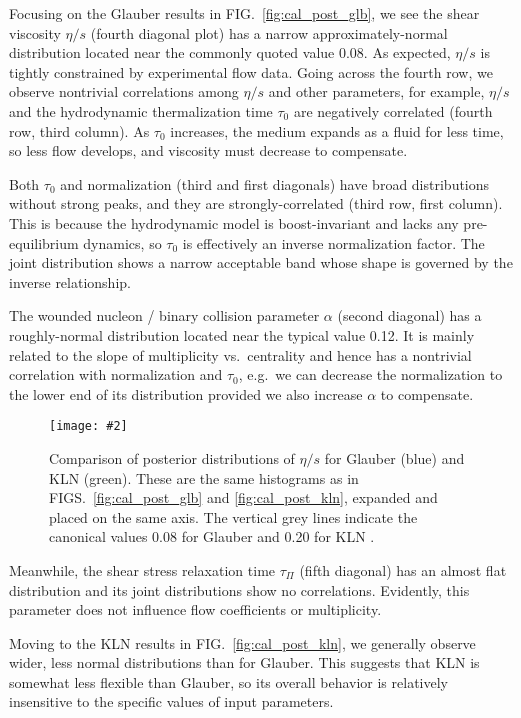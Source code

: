 \documentclass[aps,prc,reprint,superscriptaddress,amsmath]{revtex4-1}
\newcommand{\colfig}[3][t]{
  \begin{figure}[#1]
    \texttt{[image: \#2]}
    \caption{\label{fig:#2}#3}
  \end{figure}
}
\begin{document}
Focusing on the Glauber results in FIG.~\ref{fig:cal_post_glb}, we see the shear viscosity $\eta/s$ (fourth diagonal plot) has a narrow approximately-normal distribution located near the commonly quoted value 0.08.
As expected, $\eta/s$ is tightly constrained by experimental flow data.
Going across the fourth row, we observe nontrivial correlations among $\eta/s$ and other parameters, for example, $\eta/s$ and the hydrodynamic thermalization time $\tau_0$ are negatively correlated (fourth row, third column).
As $\tau_0$ increases, the medium expands as a fluid for less time, so less flow develops, and viscosity must decrease to compensate.

Both $\tau_0$ and normalization (third and first diagonals) have broad distributions without strong peaks, and they are strongly-correlated (third row, first column).
This is because the hydrodynamic model is boost-invariant and lacks any pre-equilibrium dynamics, so $\tau_0$ is effectively an inverse normalization factor.
The joint distribution shows a narrow acceptable band whose shape is governed by the inverse relationship.

The wounded nucleon / binary collision parameter $\alpha$ (second diagonal) has a roughly-normal distribution located near the typical value 0.12.
It is mainly related to the slope of multiplicity vs.\ centrality and hence has a nontrivial correlation with normalization and $\tau_0$, e.g.\ we can decrease the normalization to the lower end of its distribution provided we also increase $\alpha$ to compensate.

\colfig[b]{post_compare}{
  Comparison of posterior distributions of $\eta/s$ for Glauber (blue) and KLN (green).
  These are the same histograms as in FIGS.~\ref{fig:cal_post_glb} and \ref{fig:cal_post_kln}, expanded and placed on the same axis.
  The vertical grey lines indicate the canonical values 0.08 for Glauber and 0.20 for KLN \cite{}.
}

Meanwhile, the shear stress relaxation time $\tau_\Pi$ (fifth diagonal) has an almost flat distribution and its joint distributions show no correlations.
Evidently, this parameter does not influence flow coefficients or multiplicity.

Moving to the KLN results in FIG.~\ref{fig:cal_post_kln}, we generally observe wider, less normal distributions than for Glauber.
This suggests that KLN is somewhat less flexible than Glauber, so its overall behavior is relatively insensitive to the specific values of input parameters.
\end{document}

